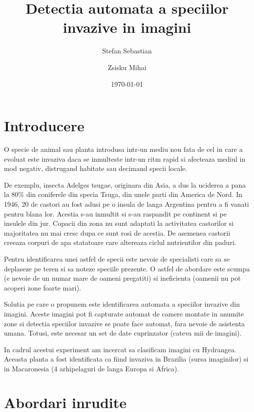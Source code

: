 \documentclass{article}
\begin{document}
\title{Detectia automata a speciilor invazive in imagini}
\author{Stefan Sebastian \and Zsisku Mihai}
\date{\today}
\maketitle

\pagebreak

\section{Introducere}
O specie de animal sau planta introdusa intr-un mediu nou fata de cel in care a evoluat este invaziva daca se inmulteste intr-un ritm rapid si afecteaza mediul in mod negativ, distrugand habitate sau decimand specii locale\cite{WEBSITE:1}.
 
De exemplu, insecta Adelges tsugae, originara din Asia, a dus la uciderea a pana la 80\% din coniferele din specia Tsuga, din unele parti din America de Nord\cite{WEBSITE:2}. In 1946, 20 de castori au fost adusi pe o insula de langa Argentina pentru a fi vanati pentru blana lor. Acestia s-au inmultit si s-au raspandit pe continent si pe insulele din jur. Copacii din zona nu sunt adaptati la activitatea castorilor si majoritatea nu mai cresc dupa ce sunt rosi de acestia. De asemenea castorii creeaza corpuri de apa statatoare care altereaza ciclul nutrientilor din paduri\cite{WEBSITE:3}.

Pentru identificarea unei astfel de specii este nevoie de specialisti care sa se deplaseze pe teren si sa noteze speciile prezente. O astfel de abordare este scumpa (e nevoie de un numar mare de oameni pregatiti) si ineficienta (oamenii nu pot acoperi zone foarte mari).

Solutia pe care o propunem este identificarea automata a speciilor invazive din imagini. Aceste imagini pot fi capturate automat de camere montate in anumite zone si detectia speciilor invazive se poate face automat, fara nevoie de asistenta umana. Totusi, este necesar un set de date cuprinzator (cateva mii de imagini).

In cadrul acestui experiment am incercat sa clasificam imagini cu Hydrangea. Aceasta planta a fost identificata ca fiind invaziva in Brazilia (sursa imaginilor) si in Macaronesia (4 arhipelaguri de langa Europa si Africa)\cite{BOOK:1}.

\section{Abordari inrudite}
\end{document}
